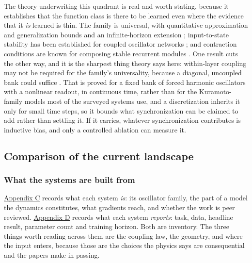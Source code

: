 \documentclass[a4paper,fleqn]{cas-sc}
\begin{document}
The theory underwriting this quadrant is real and worth stating, because
it establishes that the function class is there to be learned even where
the evidence that it \emph{is} learned is thin. The family is universal,
with quantitative approximation and generalization bounds
\citep{huang, huang2025} and an infinite-horizon extension
\citep{sagodi}; input-to-state stability has been established for
coupled oscillator networks \citep{stolzle2024}; and contraction
conditions are known for composing stable recurrent modules
\citep{kozachkov2022}. One result cuts the other way, and it is the
sharpest thing theory says here: within-layer coupling may not be
required for the family's universality, because a diagonal, uncoupled
bank could suffice \citep{lanthaler2023}. That is proved for a fixed
bank of forced harmonic oscillators with a nonlinear readout, in
continuous time, rather than for the Kuramoto-family models most of the
surveyed systems use, and a discretization inherits it only for small
time steps, so it bounds what synchronization can be claimed to add
rather than settling it. If it carries, whatever synchronization
contributes is inductive bias, and only a controlled ablation can
measure it.

\subsection{Comparison of the current landscape}\label{sec-2-3}

\subsubsection{What the systems are built from}\label{sec-2-3-1}

\hyperref[sec-C]{Appendix C} records what each system \emph{is}: its
oscillator family, the part of a model the dynamics constitutes, what
gradients reach, and whether the work is peer reviewed.
\hyperref[sec-D]{Appendix D} records what each system \emph{reports}:
task, data, headline result, parameter count and training horizon. Both
are inventory. The three things worth reading across them are the
coupling law, the geometry, and where the input enters, because those
are the choices the physics says are consequential and the papers make
in passing.
\end{document}
